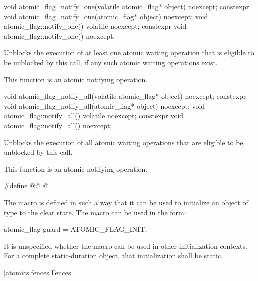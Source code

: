 \begin{itemdecl}
void atomic_flag_notify_one(volatile atomic_flag* object) noexcept;
constexpr void atomic_flag_notify_one(atomic_flag* object) noexcept;
void atomic_flag::notify_one() volatile noexcept;
constexpr void atomic_flag::notify_one() noexcept;
\end{itemdecl}

\begin{itemdescr}
\pnum
\effects
Unblocks the execution of at least one atomic waiting operation
that is eligible to be unblocked by this call,
if any such atomic waiting operations exist.

\pnum
\remarks
This function is an atomic notifying operation.
\end{itemdescr}

\begin{itemdecl}
void atomic_flag_notify_all(volatile atomic_flag* object) noexcept;
constexpr void atomic_flag_notify_all(atomic_flag* object) noexcept;
void atomic_flag::notify_all() volatile noexcept;
constexpr void atomic_flag::notify_all() noexcept;
\end{itemdecl}

\begin{itemdescr}
\pnum
\effects
Unblocks the execution of all atomic waiting operations
that are eligible to be unblocked by this call.

\pnum
\remarks
This function is an atomic notifying operation.
\end{itemdescr}

\begin{itemdecl}
#define @@ @\seebelow@
\end{itemdecl}

\begin{itemdescr}
\pnum
\remarks
The macro  is defined in such a way that
it can be used to initialize an object of type 
to the clear state.
The macro can be used in the form:
\begin{codeblock}
atomic_flag guard = ATOMIC_FLAG_INIT;
\end{codeblock}
It is unspecified whether the macro can be used
in other initialization contexts.
For a complete static-duration object, that initialization shall be static.
\end{itemdescr}

[atomics.fences]{Fences}

